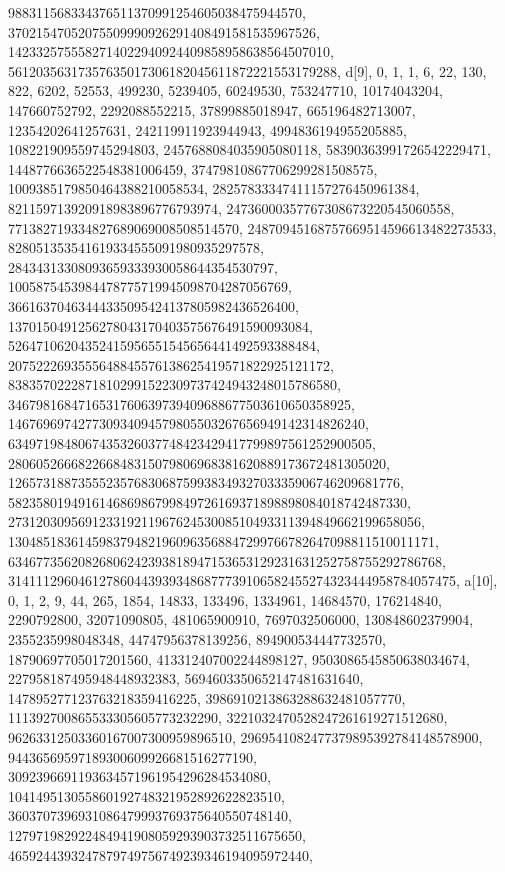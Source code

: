 {{{   988311568334376511370991254605038475944570, 
   37021547052075509990926291408491581535967526, 
   1423325755582714022940924409858958638564507010, 
   56120356317357635017306182045611872221553179288}}, 
 {d[9], {0, 1, 1, 6, 22, 130, 822, 6202, 52553, 499230, 5239405, 60249530, 
   753247710, 10174043204, 147660752792, 2292088552215, 37899885018947, 
   665196482713007, 12354202641257631, 242119911923944943, 
   4994836194955205885, 108221909559745294803, 2457688084035905080118, 
   58390363991726542229471, 1448776636522548381006459, 
   37479810867706299281508575, 1009385179850464388210058534, 
   28257833347411157276450961384, 821159713920918983896776793974, 
   24736000357767308673220545060558, 771382719334827689069008508514570, 
   24870945168757669514596613482273533, 828051353541619334555091980935297578, 
   28434313308093659333930058644354530797, 
   1005875453984478775719945098704287056769, 
   36616370463444335095424137805982436526400, 
   1370150491256278043170403575676491590093084, 
   52647106204352415956551545656441492593388484, 
   2075222693555648845576138625419571822925121172, 
   83835702228718102991522309737424943248015786580, 
   3467981684716531760639739409688677503610650358925, 
   146769697427730934094579805503267656949142314826240, 
   6349719848067435326037748423429417799897561252900505, 
   280605266682266848315079806968381620889173672481305020, 
   12657318873555235768306875993834932703335906746209681776, 
   582358019491614686986799849726169371898898084018742487330, 
   27312030956912331921196762453008510493311394849662199658056, 
   1304851836145983794821960963568847299766782647098811510011171, 
   63467735620826806242393818947153653129231631252758755292786768, 
   3141112960461278604439393486877739106582455274323444958784057475}}, 
 {a[10], {0, 1, 2, 9, 44, 265, 1854, 14833, 133496, 1334961, 14684570, 
   176214840, 2290792800, 32071090805, 481065900910, 7697032506000, 
   130848602379904, 2355235998048348, 44747956378139256, 894900534447732570, 
   18790697705017201560, 413312407002244898127, 9503086545850638034674, 
   227958187495948448932383, 5694603350652147481631640, 
   147895277123763218359416225, 3986910213863288632481057770, 
   111392700865533305605773232290, 3221032470528247261619271512680, 
   96263312503360167007300959896510, 2969541082477379895392784148578900, 
   94436569597189300609926681516277190, 
   3092396691193634571961954296284534080, 
   104149513055860192748321952892622823510, 
   3603707396931086479993769375640550748140, 
   127971982922484941908059293903732511675650, 
   4659244393247879749756749239346194095972440, 
}}}
